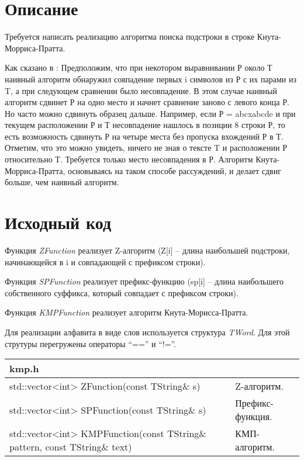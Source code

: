 \section{Описание}
Требуется написать реализацию алгоритма поиска подстроки в строке Кнута-Морриса-Пратта.

Как сказано в \cite{Gusfield}: Предположим, что при некотором выравнивании Р около Т наивный алгоритм обнаружил совпадение первых 
i символов из Р с их парами из T, а при следующем сравнении было несовпадение. 
В этом случае наивный алгоритм сдвинет Р на одно место и начнет сравнение заново с левого конца Р. 
Но часто можно сдвинуть образец дальше. Например, если Р = abcxabcde и при текущем расположении Р и Т несовпадение нашлось в позиции 8 строки Р, 
то есть возможность сдвинуть Р на четыре места без пропуска вхождений Р в Т. Отметим, что это можно увидеть, ничего не зная о тексте T и расположении Р 
относительно Т. Требуется только место несовпадения в Р. Алгоритм Кнута-Морриса-Пратта, основываясь на таком способе рассуждений, 
и делает сдвиг больше, чем наивный алгоритм.

\pagebreak

\section{Исходный код}
Функция \textit{ZFunction} реализует Z-алгоритм (Z[i] -- длина наибольшей подстроки, начинающейся в i и совпадающей с префиксом строки).

Функция \textit{SPFunction} реализует префикс-функцию (sp[i] -- длина наибольшего собственного суффикса, который совпадает с префиксом строки).

Функция \textit{KMPFunction} реализует алгоритм Кнута-Морисса-Пратта.

Для реализации алфавита в виде слов используется структура \textit{TWord}. Для этой струтуры перегружены операторы \enquote{==} и \enquote{!=}.
\begin{longtable}{|p{7.5cm}|p{7.5cm}|}
\hline
\rowcolor{lightgray}
\multicolumn{2}{|c|} {kmp.h}\\
\hline
std::vector<int> ZFunction(const TString\& s)&Z-алгоритм.\\
\hline
std::vector<int> SPFunction(const TString\& s)&Префикс-функция.\\
\hline
std::vector<int> KMPFunction(const TString\& pattern, const TString\& text)&КМП-алгоритм.\\
\hline
\end{longtable}

